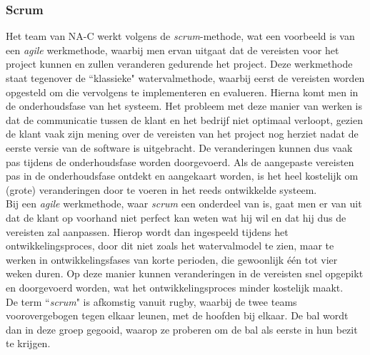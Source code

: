\documentclass[10pt,a4paper]{article}
\begin{document}
\subsubsection{Scrum}
\label{scrum}
Het team van NA-C werkt volgens de \textit{scrum}-methode, wat een voorbeeld is van een \textit{agile} werkmethode, waarbij men ervan uitgaat dat de vereisten voor het project kunnen en zullen veranderen gedurende het project. Deze werkmethode staat tegenover de ``klassieke" watervalmethode, waarbij eerst de vereisten worden opgesteld om die vervolgens te implementeren en evalueren. Hierna komt men in de onderhoudsfase van het systeem. Het probleem met deze manier van werken is dat de communicatie tussen de klant en het bedrijf niet optimaal verloopt, gezien de klant vaak zijn mening over de vereisten van het project nog herziet nadat de eerste versie van de software is uitgebracht. De veranderingen kunnen dus vaak pas tijdens de onderhoudsfase worden doorgevoerd. Als de aangepaste vereisten pas in de onderhoudsfase ontdekt en aangekaart worden, is het heel kostelijk om (grote) veranderingen door te voeren in het reeds ontwikkelde systeem.\\
Bij een \textit{agile} werkmethode, waar \textit{scrum} een onderdeel van is, gaat men er van uit dat de klant op voorhand niet perfect kan weten wat hij wil en dat hij dus de vereisten zal aanpassen. Hierop wordt dan ingespeeld tijdens het ontwikkelingsproces, door dit niet zoals het watervalmodel te zien, maar te werken in ontwikkelingsfases van korte perioden, die gewoonlijk \'e\'en tot vier weken duren. Op deze manier kunnen veranderingen in de vereisten snel opgepikt en doorgevoerd worden, wat het ontwikkelingsproces minder kostelijk maakt.\\
De term ``\textit{scrum}" is afkomstig vanuit rugby, waarbij de twee teams voorovergebogen tegen elkaar leunen, met de hoofden bij elkaar. De bal wordt dan in deze groep gegooid, waarop ze proberen om de bal als eerste in hun bezit te krijgen.\\
\end{document}
